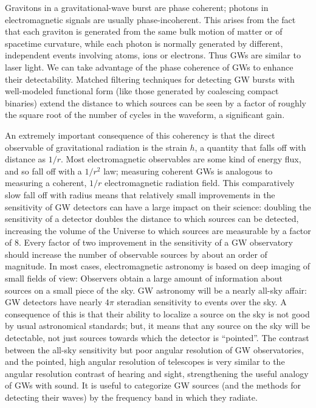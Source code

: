 \documentclass[binding=0.6cm, LaM]{sapthesis}
\begin{document}
Gravitons in a gravitational-wave burst are phase coherent; photons in electromagnetic signals are usually phase-incoherent. This arises from the fact that each graviton is generated from the same
bulk motion of matter or of spacetime curvature, while each photon is normally generated by different, independent events involving atoms, ions or electrons.
Thus GWs are similar to laser light. We can take advantage of the phase coherence of GWs to enhance their detectability. Matched filtering techniques for detecting GW bursts with well-modeled
functional form (like those generated by coalescing compact binaries) extend the distance to which sources can be seen by a factor of roughly the square root of the number of cycles in the waveform,
a significant gain.

An extremely important consequence of this coherency is that the direct observable of gravitational radiation is the strain $h$, a quantity that falls off with distance as $1/r$.
Most electromagnetic observables are some kind of energy flux, and so fall off with a $1/r^2$ law; measuring coherent GWs is analogous to measuring a coherent, $1/r$
electromagnetic radiation field. This comparatively slow fall off with radius means that relatively small improvements in the sensitivity of GW detectors can have a large impact on their science:
doubling the sensitivity of a detector doubles the distance to which sources can be detected, increasing the volume of the Universe to which sources are measurable by a factor of 8.
Every factor of two improvement in the sensitivity of a GW observatory should increase the number of observable sources by about an order of magnitude.
In most cases, electromagnetic astronomy is based on deep imaging of small fields of view: Observers obtain a large amount of information about sources on a small piece of the sky.
GW astronomy will be a nearly all-sky affair: GW detectors have nearly $4\pi$ steradian sensitivity to events over the sky. A consequence of this is that their ability to localize a source on the sky
 is not good by usual astronomical standards; but, it means that any source on the sky will be detectable, not just sources towards which the detector is “pointed”.
The contrast between the all-sky sensitivity but poor angular resolution of GW observatories, and the pointed, high angular resolution of telescopes is very similar to the angular resolution contrast
 of hearing and sight, strengthening the useful analogy of GWs with sound.
It is useful to categorize GW sources (and the methods for detecting their waves) by the frequency band in which they radiate.
\end{document}
